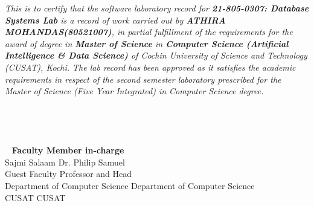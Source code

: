 \documentclass[a4paper,12pt]{report}
\begin{document}
	\textit{This is to certify that the software laboratory record for \textbf{21-805-0307: Database Systems Lab} is a record of work carried out by \textbf{ATHIRA MOHANDAS(80521007)}, in partial fulfillment of the requirements for the award of degree in \textbf{Master of Science\small{}} \normalsize in \textbf{Computer Science (Artificial Intelligence \& Data Science)} of Cochin University of Science and Technology (CUSAT), Kochi. The lab record has been approved as it satisfies the academic requirements in respect of the second semester laboratory prescribed for the Master of Science (Five Year Integrated) in Computer Science degree.\\\\\\\\\\\ }
	\vspace{50pt}
	\small\textbf{Faculty Member in-charge\\}
	\vspace{0pt}
	Sajmi Salaam \hspace{275pt} Dr. Philip Samuel \\
	Guest Faculty \hspace{267 pt} Professor and Head\\
	Department of Computer Science \hspace{106pt} Department of Computer Science \\
	CUSAT \hspace{352pt} CUSAT
	

	\newpage
	
    \setcounter{page}{1}


	
	\pagestyle{fancy}
	\fancyfoot[C]{}
		
\end{document}
